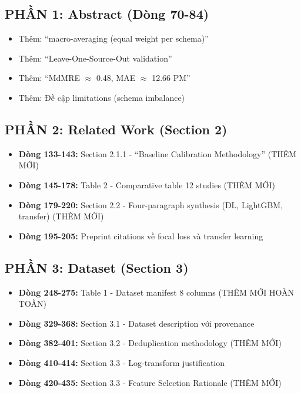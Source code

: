 \documentclass[11pt,a4paper]{article}
\begin{document}
\subsection{PHẦN 1: Abstract (Dòng 70-84)}
\begin{itemize}
    \item Thêm: ``macro-averaging (equal weight per schema)''
    \item Thêm: ``Leave-One-Source-Out validation''
    \item Thêm: ``MdMRE $\approx$ 0.48, MAE $\approx$ 12.66 PM''
    \item Thêm: Đề cập limitations (schema imbalance)
\end{itemize}

\subsection{PHẦN 2: Related Work (Section 2)}
\begin{itemize}
    \item \textbf{Dòng 133-143:} Section 2.1.1 - ``Baseline Calibration Methodology'' (THÊM MỚI)
    \item \textbf{Dòng 145-178:} Table 2 - Comparative table 12 studies (THÊM MỚI)
    \item \textbf{Dòng 179-220:} Section 2.2 - Four-paragraph synthesis (DL, LightGBM, transfer) (THÊM MỚI)
    \item \textbf{Dòng 195-205:} Preprint citations về focal loss và transfer learning
\end{itemize}

\subsection{PHẦN 3: Dataset (Section 3)}
\begin{itemize}
    \item \textbf{Dòng 248-275:} Table 1 - Dataset manifest 8 columns (THÊM MỚI HOÀN TOÀN)
    \item \textbf{Dòng 329-368:} Section 3.1 - Dataset description với provenance
    \item \textbf{Dòng 382-401:} Section 3.2 - Deduplication methodology (THÊM MỚI)
    \item \textbf{Dòng 410-414:} Section 3.3 - Log-transform justification
    \item \textbf{Dòng 420-435:} Section 3.3 - Feature Selection Rationale (THÊM MỚI)
\end{itemize}
\end{document}
